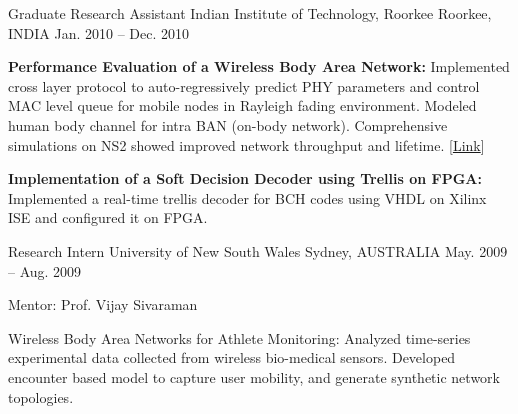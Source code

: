 \begin{cventries}
  \cventry
    {Graduate Research Assistant} %
    {Indian Institute of Technology, Roorkee} %
    {Roorkee, INDIA} %
    {Jan. 2010 -- Dec. 2010} %
    {
      \begin{cvitems} %
    \item {\textbf{Performance Evaluation of a Wireless Body Area Network:} Implemented cross layer protocol to auto-regressively predict PHY parameters and control MAC level queue for mobile nodes in Rayleigh fading environment. Modeled human body channel for intra BAN (on-body network). Comprehensive simulations on NS2 showed improved network throughput and lifetime. \hfill [\href{https://sarthakgrover.github.io/publication/performance-WBAN2010.pdf}{Link}]}
    \item {\textbf{Implementation of a Soft Decision Decoder using Trellis on FPGA:} Implemented a real-time trellis decoder for BCH codes using VHDL on Xilinx ISE and configured it on FPGA.}
    \end{cvitems}
    }
    
  \cventry
    {Research Intern} %
    {University of New South Wales} %
    {Sydney, AUSTRALIA} %
    {May. 2009 -- Aug. 2009} %
    {
      \begin{cvitems} %
     \item {Mentor: Prof. Vijay Sivaraman}
     \item {Wireless Body Area Networks for Athlete Monitoring: Analyzed time-series experimental data collected from wireless bio-medical sensors. Developed encounter based model to capture user mobility, and generate synthetic network topologies.}
    \end{cvitems}
    }

\end{cventries}


